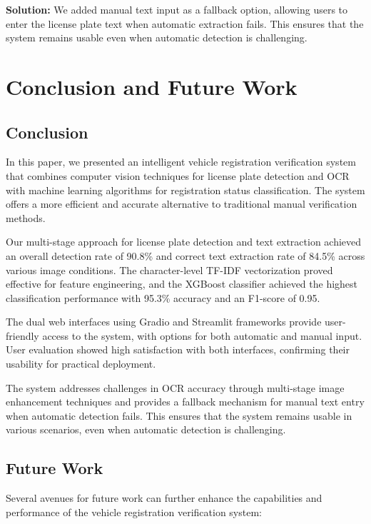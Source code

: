 \documentclass[conference]{IEEEtran}
\begin{document}
\textbf{Solution:} We added manual text input as a fallback option, allowing users to enter the license plate text when automatic extraction fails. This ensures that the system remains usable even when automatic detection is challenging.

\section{Conclusion and Future Work}

\subsection{Conclusion}
In this paper, we presented an intelligent vehicle registration verification system that combines computer vision techniques for license plate detection and OCR with machine learning algorithms for registration status classification. The system offers a more efficient and accurate alternative to traditional manual verification methods.

Our multi-stage approach for license plate detection and text extraction achieved an overall detection rate of 90.8\% and correct text extraction rate of 84.5\% across various image conditions. The character-level TF-IDF vectorization proved effective for feature engineering, and the XGBoost classifier achieved the highest classification performance with 95.3\% accuracy and an F1-score of 0.95.

The dual web interfaces using Gradio and Streamlit frameworks provide user-friendly access to the system, with options for both automatic and manual input. User evaluation showed high satisfaction with both interfaces, confirming their usability for practical deployment.

The system addresses challenges in OCR accuracy through multi-stage image enhancement techniques and provides a fallback mechanism for manual text entry when automatic detection fails. This ensures that the system remains usable in various scenarios, even when automatic detection is challenging.

\subsection{Future Work}
Several avenues for future work can further enhance the capabilities and performance of the vehicle registration verification system:
\end{document}
